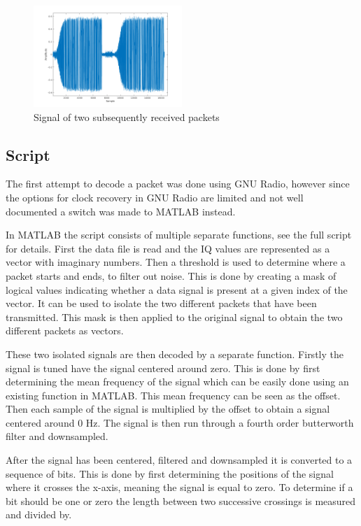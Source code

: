\documentclass{IEEEtran}
\begin{document}
\begin{figure}[h]
		\includegraphics[width=0.5\textwidth]{plots/Two_packets_signal.png}
		\caption{Signal of two subsequently received packets}
		\label{fig:2_packets_sig}
\end{figure}



\subsection{Script}

The first attempt to decode a packet was done using GNU Radio, however since the options for clock recovery in GNU Radio are limited and not well documented a switch was made to MATLAB instead. 

In MATLAB the script consists of multiple separate functions, see the full script for details. First the data file is read and the IQ values are represented as a vector with imaginary numbers. Then a threshold is used to determine where a packet starts and ends, to filter out noise. This is done by creating a mask of logical values indicating whether a data signal is present at a given index of the vector. It can be used to isolate the two different packets that have been transmitted. This mask is then applied to the original signal to obtain the two different packets as vectors.  

These two isolated signals are then decoded by a separate function. Firstly the signal is tuned have the signal centered around zero. %
This is done by first determining the mean frequency of the signal which can be easily done using an existing function in MATLAB. This mean frequency can be seen as the offset. Then each sample of the signal is multiplied by the offset to obtain a signal centered around 0 Hz. The signal is then run through a fourth order butterworth filter and downsampled.

After the signal has been centered, filtered and downsampled it is converted to a sequence of bits. This is done by first determining the positions of the signal where it crosses the x-axis, meaning the signal is equal to zero. %
To determine if a bit should be one or zero the length between two successive crossings is measured and divided by. %
\end{document}
